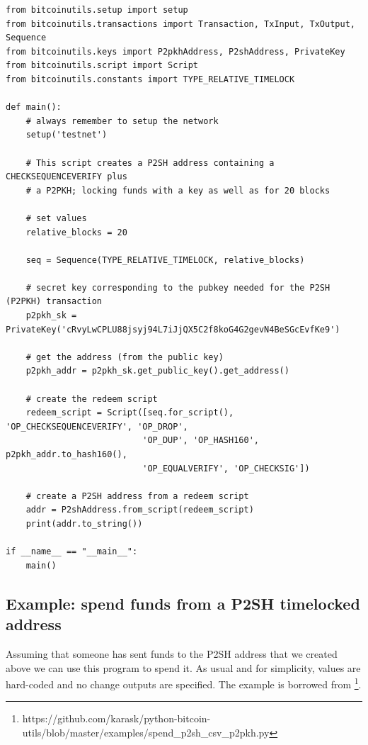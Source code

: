 \vspace{1em}
\begin{lstlisting}[style=Python]
from bitcoinutils.setup import setup
from bitcoinutils.transactions import Transaction, TxInput, TxOutput, Sequence
from bitcoinutils.keys import P2pkhAddress, P2shAddress, PrivateKey
from bitcoinutils.script import Script
from bitcoinutils.constants import TYPE_RELATIVE_TIMELOCK

def main():
    # always remember to setup the network
    setup('testnet')

    # This script creates a P2SH address containing a CHECKSEQUENCEVERIFY plus
    # a P2PKH; locking funds with a key as well as for 20 blocks

    # set values
    relative_blocks = 20

    seq = Sequence(TYPE_RELATIVE_TIMELOCK, relative_blocks)

    # secret key corresponding to the pubkey needed for the P2SH (P2PKH) transaction
    p2pkh_sk = PrivateKey('cRvyLwCPLU88jsyj94L7iJjQX5C2f8koG4G2gevN4BeSGcEvfKe9')

    # get the address (from the public key)
    p2pkh_addr = p2pkh_sk.get_public_key().get_address()

    # create the redeem script
    redeem_script = Script([seq.for_script(), 'OP_CHECKSEQUENCEVERIFY', 'OP_DROP', 
                           'OP_DUP', 'OP_HASH160', p2pkh_addr.to_hash160(),
                           'OP_EQUALVERIFY', 'OP_CHECKSIG'])

    # create a P2SH address from a redeem script
    addr = P2shAddress.from_script(redeem_script)
    print(addr.to_string())

if __name__ == "__main__":
    main()
\end{lstlisting}
\vspace{1em}



\subsection*{Example: spend funds from a P2SH timelocked address}
\label{ssec:p2sh-csv-spend-example}
Assuming that someone has sent funds to the P2SH address that we created above we can use this program to spend it. As usual and for simplicity, values are hard-coded and no change outputs are specified. The example is borrowed from \footnote{https://github.com/karask/python-bitcoin-utils/blob/master/examples/spend\_p2sh\_csv\_p2pkh.py}.

